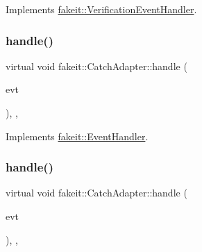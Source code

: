 Implements \mbox{\hyperlink{structfakeit_1_1VerificationEventHandler_a826b9d15e23bad7013b219d8e45ef1d0}{fakeit\+::\+Verification\+Event\+Handler}}.

\mbox{\label{classfakeit_1_1CatchAdapter_aa6269004e30a0ecee8456f4a0e1681ff}} 
\subsubsection{\texorpdfstring{handle()}{handle()}\hspace{0.1cm}{\footnotesize\ttfamily [4/6]}}
{\footnotesize\ttfamily virtual void fakeit\+::\+Catch\+Adapter\+::handle (\begin{DoxyParamCaption}\item[{const \mbox{\hyperlink{structfakeit_1_1UnexpectedMethodCallEvent}{Unexpected\+Method\+Call\+Event}} \&}]{evt }\end{DoxyParamCaption})\hspace{0.3cm}{\ttfamily [inline]}, {\ttfamily [override]}, {\ttfamily [virtual]}}



Implements \mbox{\hyperlink{structfakeit_1_1EventHandler_a4de5ad05e5de73e36f4b2cede6d8efd3}{fakeit\+::\+Event\+Handler}}.

\mbox{\label{classfakeit_1_1CatchAdapter_ab4108a6770a6f02082e7662dbf4b836c}} 
\subsubsection{\texorpdfstring{handle()}{handle()}\hspace{0.1cm}{\footnotesize\ttfamily [5/6]}}
{\footnotesize\ttfamily virtual void fakeit\+::\+Catch\+Adapter\+::handle (\begin{DoxyParamCaption}\item[{const \mbox{\hyperlink{structfakeit_1_1SequenceVerificationEvent}{Sequence\+Verification\+Event}} \&}]{evt }\end{DoxyParamCaption})\hspace{0.3cm}{\ttfamily [inline]}, {\ttfamily [override]}, {\ttfamily [virtual]}}



